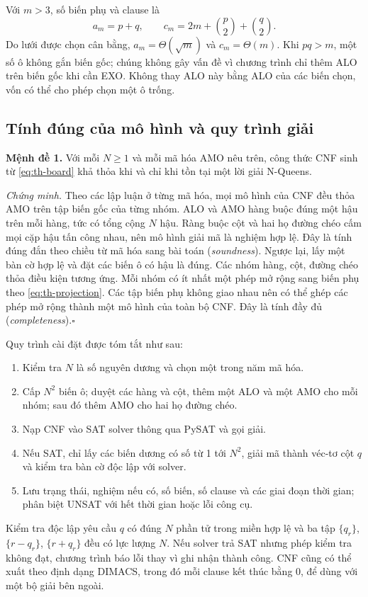 Với $m>3$, số biến phụ và clause là
\begin{equation}
 a_m=p+q,\qquad c_m=2m+\binom p2+\binom q2.
 \label{eq:th-product-count}
\end{equation}
Do lưới được chọn cân bằng, $a_m=\Theta(\sqrt m)$ và $c_m=\Theta(m)$.
Khi $pq>m$, một số ô không gắn biến gốc; chúng không gây vấn đề vì
chương trình chỉ thêm ALO trên biến gốc khi cần EXO. Không thay ALO này
bằng ALO của các biến chọn, vốn có thể cho phép chọn một ô trống.

\subsection{Tính đúng của mô hình và quy trình giải}

\noindent\textbf{Mệnh đề 1.}
Với mỗi $N\geq1$ và mỗi mã hóa AMO nêu trên, công thức CNF sinh từ
\eqref{eq:th-board} khả thỏa khi và chỉ khi tồn tại một lời giải N-Queens.

\noindent\emph{Chứng minh.}
Theo các lập luận ở từng mã hóa, mọi mô hình của CNF đều thỏa AMO trên
tập biến gốc của từng nhóm. ALO và AMO hàng buộc đúng một hậu trên mỗi
hàng, tức có tổng cộng $N$ hậu. Ràng buộc cột và hai họ đường chéo
cấm mọi cặp hậu tấn công nhau, nên mô hình giải mã là nghiệm hợp lệ.
Đây là tính đúng đắn theo chiều từ mã hóa sang bài toán (\emph{soundness}).
Ngược lại, lấy một bàn cờ hợp lệ và đặt các biến ô có hậu là đúng.
Các nhóm hàng, cột, đường chéo thỏa điều kiện tương ứng. Mỗi nhóm có
ít nhất một phép mở rộng sang biến phụ theo
\eqref{eq:th-projection}. Các tập biến phụ không giao nhau nên có thể
ghép các phép mở rộng thành một mô hình của toàn bộ CNF. Đây là tính
đầy đủ (\emph{completeness}).\hfill$\square$

Quy trình cài đặt được tóm tắt như sau:
\begin{enumerate}
 \item Kiểm tra $N$ là số nguyên dương và chọn một trong năm mã hóa.
 \item Cấp $N^2$ biến ô; duyệt các hàng và cột, thêm một ALO và một
       AMO cho mỗi nhóm; sau đó thêm AMO cho hai họ đường chéo.
 \item Nạp CNF vào SAT solver thông qua PySAT \cite{pysat} và gọi giải.
 \item Nếu SAT, chỉ lấy các biến dương có số từ 1 tới $N^2$, giải mã
       thành véc-tơ cột $q$ và kiểm tra bàn cờ độc lập với solver.
 \item Lưu trạng thái, nghiệm nếu có, số biến, số clause và các giai
       đoạn thời gian; phân biệt UNSAT với hết thời gian hoặc lỗi công cụ.
\end{enumerate}
Kiểm tra độc lập yêu cầu $q$ có đúng $N$ phần tử trong miền hợp lệ và
ba tập $\{q_r\}$, $\{r-q_r\}$, $\{r+q_r\}$ đều có lực lượng $N$.
Nếu solver trả SAT nhưng phép kiểm tra không đạt, chương trình báo lỗi
thay vì ghi nhận thành công. CNF cũng có thể xuất theo định dạng DIMACS,
trong đó mỗi clause kết thúc bằng 0, để dùng với một bộ giải bên ngoài.

